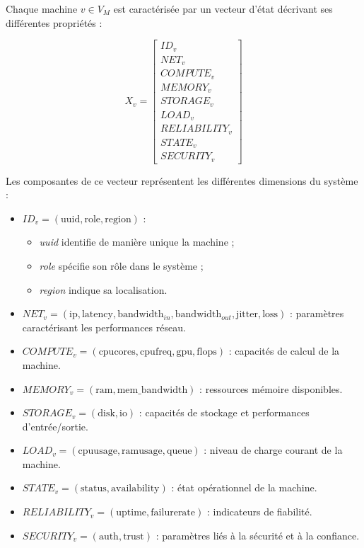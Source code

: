 \documentclass[12pt,a4paper]{report}
\theoremstyle{definition}
\begin{document}
Chaque machine $v \in V_M$ est caractérisée par un vecteur d’état décrivant ses différentes propriétés :

\[
X_v =
\begin{bmatrix}
ID_v \\
NET_v \\
COMPUTE_v \\
MEMORY_v \\
STORAGE_v \\
LOAD_v \\
RELIABILITY_v \\
STATE_v \\
SECURITY_v
\end{bmatrix}
\]

Les composantes de ce vecteur représentent les différentes dimensions du système :

\begin{itemize}
    \item[*] $ID_v = (\text{uuid}, \text{role}, \text{region})$ :
    \begin{itemize}
        \item[>] \textit{uuid} identifie de manière unique la machine ;
        \item[>] \textit{role} spécifie son rôle dans le système ;
        \item[>] \textit{region} indique sa localisation.
    \end{itemize}

    \item[*] $NET_v = (\text{ip}, \text{latency}, \text{bandwidth}_{in}, \text{bandwidth}_{out}, \text{jitter}, \text{loss})$ : paramètres caractérisant les performances réseau.

    \item[*] $COMPUTE_v = (\text{cpucores}, \text{cpufreq}, \text{gpu}, \text{flops})$ : capacités de calcul de la machine.

    \item[*] $MEMORY_v = (\text{ram}, \text{mem\_bandwidth})$ : ressources mémoire disponibles.

    \item[*] $STORAGE_v = (\text{disk}, \text{io})$ : capacités de stockage et performances d’entrée/sortie.

    \item[*] $LOAD_v = (\text{cpuusage}, \text{ramusage}, \text{queue})$ : niveau de charge courant de la machine.

    \item[*] $STATE_v = (\text{status}, \text{availability})$ : état opérationnel de la machine.

    \item[*] $RELIABILITY_v = (\text{uptime}, \text{failurerate})$ : indicateurs de fiabilité.

    \item[*] $SECURITY_v = (\text{auth}, \text{trust})$ : paramètres liés à la sécurité et à la confiance.
\end{itemize}
\end{document}
